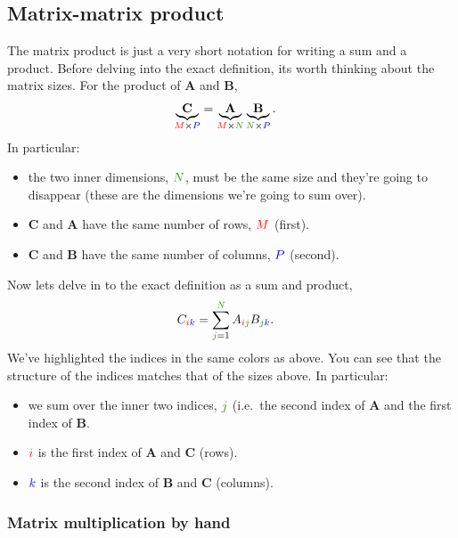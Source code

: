 \documentclass{article}
\newcommand{\A}{\mathbf{A}}
\newcommand{\B}{\mathbf{B}}
\newcommand{\C}{\mathbf{C}}
\begin{document}
\subsection{Matrix-matrix product}
\renewcommand{\M}{\textcolor{red}{M}}
\renewcommand{\N}{\textcolor{OliveGreen}{N}}
\renewcommand{\P}{\textcolor{blue}{P}}
\renewcommand{\i}{\textcolor{red}{i}}
\renewcommand{\j}{\textcolor{OliveGreen}{j}}
\renewcommand{\k}{\textcolor{blue}{k}}
The matrix product is just a very short notation for writing a sum and a product.
Before delving into the exact definition, its worth thinking about the matrix sizes. For the product of $\A$ and $\B$,
\begin{align}
  \underbrace{\C}_{\textcolor{red}{M} \times \textcolor{blue}{P}} &= \underbrace{\A}_{\textcolor{red}{M} \times \N} \underbrace{\B}_{\N \times \textcolor{blue}{P}}.
\end{align}
In particular: 
\begin{itemize}
  \item the two inner dimensions, $\N$, must be the same size and they're going to disappear (these are the dimensions we're going to sum over).
  \item $\C$ and $\A$ have the same number of rows, $\M$ (first).
  \item $\C$ and $\B$ have the same number of columns, $\P$ (second).
\end{itemize}
Now lets delve in to the exact definition as a sum and product,
\begin{align}
  C_{\i\k} &= \sum_{\j=1}^{\N} A_{\i\j} B_{\j\k}.
\end{align}
We've highlighted the indices in the same colors as above. 
You can see that the structure of the indices matches that of the sizes above.
In particular: 
\begin{itemize}
  \item we sum over the inner two indices, $\j$ (i.e.\ the second index of $\A$ and the first index of $\B$.
  \item $\i$ is the first index of $\A$ and $\C$ (rows).
  \item $\k$ is the second index of $\B$ and $\C$ (columns).
\end{itemize}

\subsubsection{Matrix multiplication by hand}
\end{document}
